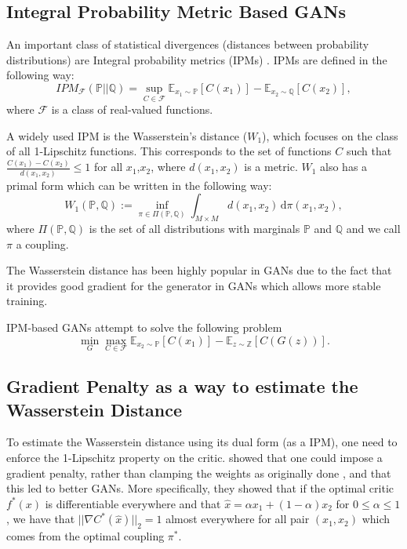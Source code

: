 \documentclass{article}
\begin{document}
\subsection{Integral Probability Metric Based GANs}

An important class of statistical divergences (distances between probability distributions) are Integral probability metrics (IPMs) \citep{muller1997integral}. IPMs are defined in the following way:
\[
IPM_{\mathcal{F}} (\mathbb{P} || \mathbb{Q}) = \sup_{C \in \mathcal{F}} \mathbb{E}_{x_1 \sim \mathbb{P}}[C(x_1)] - \mathbb{E}_{x_2 \sim \mathbb{Q}}[C(x_2)],
\]
where $\mathcal{F}$ is a class of real-valued functions.

A widely used IPM is the Wasserstein's distance ($W_1$), which focuses on the class of all 1-Lipschitz functions. This corresponds to the set of functions $C$ such that $\frac{C(x_1)-C(x_2)}{d(x_1,x_2)} \leq 1$ for all $x_1$,$x_2$, where $d(x_1,x_2)$ is a metric. $W_1$ also has a primal form which can be written in the following way:
\[ W_1 (\mathbb{P}, \mathbb{Q}):= \inf_{\pi \in \Pi (\mathbb{P}, \mathbb{Q})} \int_{M \times M} d(x_1, x_2) \, \mathrm{d} \pi (x_1, x_2),\]
where $\Pi (\mathbb{P}, \mathbb{Q})$ is the set of all distributions with marginals $\mathbb{P}$ and $\mathbb{Q}$ and we call $\pi$ a coupling.

The Wasserstein distance has been highly popular in GANs due to the fact that it provides good gradient for the generator in GANs which allows more stable training.

IPM-based GANs \citep{WGAN, WGAN-GP} attempt to solve the following problem \[ \min_{G} \max_{C \in \mathcal{F}} \mathbb{E}_{x_2 \sim \mathbb{P}}[C(x_1)] - \mathbb{E}_{z \sim \mathbb{Z}}[C(G(z))].\]

\subsection{Gradient Penalty as a way to estimate the Wasserstein Distance}
\label{sec:GANs}

To estimate the Wasserstein distance using its dual form (as a IPM), one need to enforce the 1-Lipschitz property on the critic. \citet{WGAN-GP} showed that one could impose a gradient penalty, rather than clamping the weights as originally done \citep{WGAN}, and that this led to better GANs. More specifically, they showed that if the optimal critic $f^{*}(x)$ is differentiable everywhere and that $\hat{x} = \alpha x_1 + (1-\alpha)x_2$ for $0 \leq \alpha \leq 1$, we have that $||\nabla C^{*}(\hat{x})||_2 = 1$ almost everywhere for all pair $(x_1,x_2)$ which comes from the optimal coupling $\pi^{*}$. 
\end{document}
